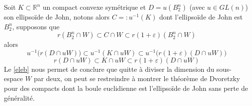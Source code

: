 \documentclass[12pt]{article}
\theoremstyle{definition}
\renewenvironment{leftbar}{%
	\def\FrameCommand{\vrule width 0.4pt \hspace{10pt}}%
	\MakeFramed {\advance\hsize-\width \FrameRestore}}%
{\endMakeFramed}
\begin{document}
\begin{leftbar}
\begin{rem}\label{rem0}
Soit $K\subset \mathbb{R}^n$ un compact convexe symétrique et $D=u(B_2^n)$ (avec $u\in GL(n)$) son ellipsoïde de John, notons alors $C=:u^{-1}(K)$ dont l'ellipsoïde de John est $B_2^n$, supposons que
\begin{equation*}
r (B_2^n\cap W)\subset C\cap W \subset r(1+\varepsilon)(B_2^n\cap W)
\end{equation*}
alors 
\begin{equation*}
u^{-1}\big(r(D\cap uW)\big)\subset u^{-1}(K\cap uW)\subset u^{-1}\big(r(1+\varepsilon)(D\cap uW)\big)
\end{equation*}
\begin{equation*}
r(D\cap uW)\subset K\cap uW \subset r(1+\varepsilon)(D\cap uW)
\end{equation*}
Le \cref{eleb} nous permet de conclure que quitte à diviser la dimension du sous-espace $W$ par deux, on peut se restreindre à montrer le théorème de Dvoretzky pour des compacts dont la boule euclidienne est l'ellipsoïde de John sans perte de généralité.
\end{rem}\end{leftbar}
\end{document}
